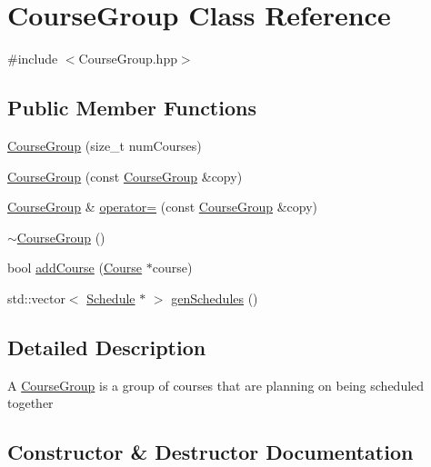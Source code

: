 \hypertarget{class_course_group}{}\section{Course\+Group Class Reference}
\label{class_course_group}


{\ttfamily \#include $<$Course\+Group.\+hpp$>$}

\subsection*{Public Member Functions}
\begin{DoxyCompactItemize}
\item 
\hyperlink{class_course_group_acc48b62c900935a5f45f492496e72892}{Course\+Group} (size\+\_\+t num\+Courses)
\item 
\hyperlink{class_course_group_a70f7170095887315d041f92fd8f0d25e}{Course\+Group} (const \hyperlink{class_course_group}{Course\+Group} \&copy)
\item 
\hyperlink{class_course_group}{Course\+Group} \& \hyperlink{class_course_group_a1464e43764972e4877a8ea1104a03cf9}{operator=} (const \hyperlink{class_course_group}{Course\+Group} \&copy)
\item 
\hyperlink{class_course_group_a4a1255d37d5dbbca372ae4e6dae510a6}{$\sim$\+Course\+Group} ()
\item 
bool \hyperlink{class_course_group_afbca7260e1af089189457e9737815545}{add\+Course} (\hyperlink{class_course}{Course} $\ast$course)
\item 
std\+::vector$<$ \hyperlink{class_schedule}{Schedule} $\ast$ $>$ \hyperlink{class_course_group_ad1812ef72db621b2ff62e66f098ad0ba}{gen\+Schedules} ()
\end{DoxyCompactItemize}


\subsection{Detailed Description}
A \hyperlink{class_course_group}{Course\+Group} is a group of courses that are planning on being scheduled together 

\subsection{Constructor \& Destructor Documentation}
\hypertarget{class_course_group_acc48b62c900935a5f45f492496e72892}{}
